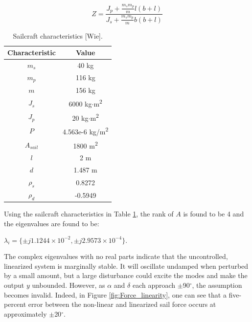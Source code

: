 \documentclass[]{aiaa-tc}%
\begin{document}
\begin{equation}
Z=\frac{J_p + \frac{m_sm_p}{m}l(b+l)}{J_s + \frac{m_sm_p}{m}b(b+l)}
\end{equation}
	
	\begin{table}[H]%
		\begin{center}
			\caption{Sailcraft characteristics [Wie].}
			\label{t:Primary_variables}
			\begin{tabular}{|c|c|}
\hline 
Characteristic & Value  \\ \hline
$m_s$         &     40 kg\\
$m_p$         &      116 kg \\
$m$         &     156 kg \\
$J_s$   &     6000 kg$\cdot$m\textsuperscript{2} \\
$J_p$   &     20 kg$\cdot$m\textsuperscript{2} \\
$P$   &      4.563e-6 kg/m\textsuperscript{2}\\
$A_{sail}$       &     1800 m\textsuperscript{2} \\
$l$       &   2 m \\
$d$       &     1.487 m \\
$\rho_s$ &     0.8272 \\
$\rho_d$ &     -0.5949 \\
\hline
			\end{tabular}
		\end{center}
	\end{table}  

	Using the sailcraft characteristics in Table \ref{t:Primary_variables}, the rank of $A$ is found to be 4 and the eigenvalues are found to be:
	
	\vspace{5 mm}
{\centering
 $\lambda_i = \{\pm j1.1244\times10^{-2}, \pm j2.9573\times10^{-4}\}$.\par
}
	
	\vspace{5 mm}

	The complex eigenvalues with no real parts indicate that the uncontrolled, linearized system is marginally stable. It will oscillate undamped when perturbed by a small amount, but a large disturbance could excite the modes and make the output $y$ unbounded. However, as $\alpha$ and $\delta$ each approach $\pm$90$^{\circ}$, the assumption becomes invalid. Indeed, in Figure \ref{fig:Force_linearity}, one can see that a five-percent error between the non-linear and linearized sail force occurs at approximately $\pm$20$^{\circ}$.
\end{document}
